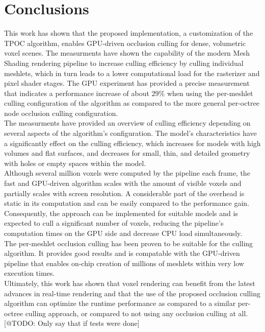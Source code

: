 \chapter{Conclusions} \label{cpt-conclusion}

This work has shown that the proposed implementation, a customization of the 
\ac{TPOC} algorithm, enables \ac{GPU}-driven occlusion culling for dense, volumetric 
voxel scenes. The measurments have shown the capability of the modern Mesh Shading 
rendering pipeline to increase culling efficiency by culling individual meshlets, 
which in turn leads to a lower computational load for the rasterizer and pixel shader 
stages. The \ac{GPU} experiment has provided a precise measurement that indicates a 
performance increase of about $29 \%$ when using the per-meshlet culling configuration 
of the algorithm as compared to the more general per-octree node occlusion culling 
configuration. \\

\noindent
The measurments have provided an overview of culling efficiency depending on several aspects 
of the algorithm's configuration. The model's characteristics have a significantly 
effect on the culling efficiency, which increases for models with high volumes and flat 
surfaces, and decreases for small, thin, and detailed geometry with holes or empty spaces 
within the model. \\

\noindent
Although several million voxels were computed by the pipeline each frame, the fast and 
\ac{GPU}-driven algorithm scales with the amount of visible voxels and partially scales 
with screen resolution. A considerable part of the overhead is static in its computation 
and can be easily compared to the performance gain. Consequently, the approach can be 
implemented for suitable models and is expected to cull a significant number of voxels, 
reducing the pipeline's computation times on the \ac{GPU} side and decrease \ac{CPU} load 
simultaneously. \\

\noindent
The per-meshlet occlusion culling has been proven to be suitable for the culling algorithm.
It provides good results and is compatable with the \ac{GPU}-driven pipeline that enables 
on-chip creation of millions of meshlets within very low execution times. \\

\noindent
Ultimately, this work has shown that voxel rendering can benefit from the latest advances 
in real-time rendering and that the use of the proposed occlusion culling algorithm can 
optimize the runtime performance as compared to a similar per-octree culling approach, or 
compared to not using any occlusion culling at all. [@TODO: Only say that if tests were done]


